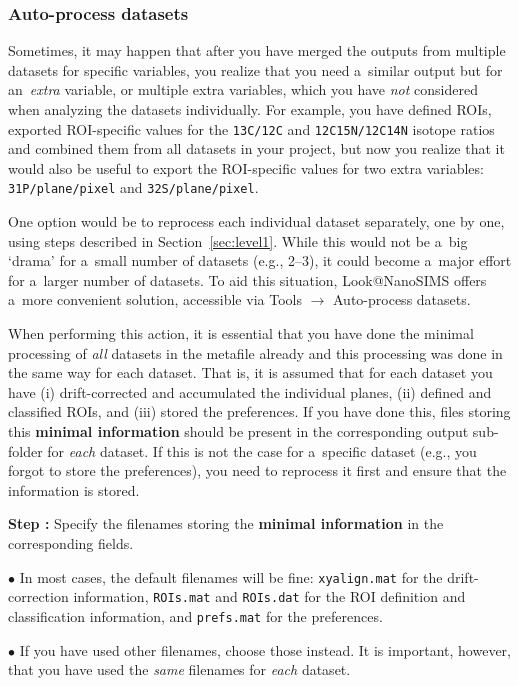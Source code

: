 \documentclass[a4paper, 11pt]{article}
\newcommand{\ttt}[1]{\texttt{#1}}
\newcommand{\lans}[1]{{\color{magenta}#1}}
\newcommand{\lanstf}[1]{{\color{cyan}#1}}
\newcommand\ra{\rightarrow}
\newcounter{step}
\newcommand\s{\addtocounter{step}{1}\noindent\textbf{Step \thestep:}{ }}
\newcommand\bul{\noindent$\bullet${ }}
\newcommand\bb[1]{\textbf{#1}}
\begin{document}
\subsubsection{Auto-process datasets}
\setcounter{step}{0}

Sometimes, it may happen that after you have merged the outputs from multiple datasets for specific variables, you realize that you need a~similar output but for an~\emph{extra} variable, or multiple extra variables, which you have \emph{not} considered when analyzing the datasets individually. For example, you have defined ROIs, exported ROI-specific values for the \ttt{13C/12C} and \ttt{12C15N/12C14N} isotope ratios and combined them from all datasets in your project, but now you realize that it would also be useful to export the ROI-specific values for two extra variables: \ttt{31P/plane/pixel} and \ttt{32S/plane/pixel}. 

One option would be to reprocess each individual dataset separately, one by one, using steps described in Section~\ref{sec:level1}. While this would not be a~big `drama' for a~small number of datasets (e.g., 2--3), it could become a~major effort for a~larger number of datasets. To aid this situation, Look@NanoSIMS offers a~more convenient solution, accessible via \lans{Tools} $\ra$ \lans{Auto-process datasets}.

When performing this action, it is essential that you have done the minimal processing of \emph{all} datasets in the metafile already and this processing was done in the same way for each dataset. That is, it is assumed that for each dataset you have (i) drift-corrected and accumulated the individual planes, (ii) defined and classified ROIs, and (iii) stored the preferences. If you have done this, files storing this \bb{minimal information} should be present in the corresponding output sub-folder for \emph{each} dataset. If this is not the case for a~specific dataset (e.g., you forgot to store the preferences), you need to reprocess it first and ensure that the information is stored.

\s Specify the filenames storing the \bb{minimal information} in the corresponding \lanstf{fields}.

\bul In most cases, the default filenames will be fine: \ttt{xyalign.mat} for the drift-correction information, \ttt{ROIs.mat} and \ttt{ROIs.dat} for the ROI definition and classification information, and \ttt{prefs.mat} for the preferences. 

\bul If you have used other filenames, choose those instead. It is important, however, that you have used the \emph{same} filenames for \emph{each} dataset.
\end{document}
